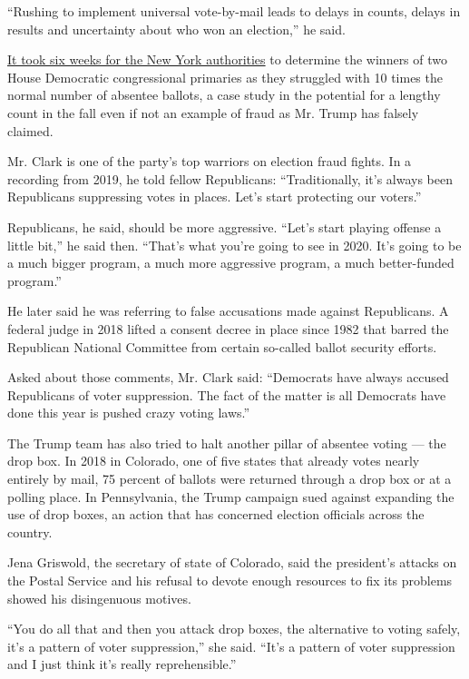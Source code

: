 ``Rushing to implement universal vote-by-mail leads to delays in counts,
delays in results and uncertainty about who won an election,'' he said.

\href{https://www.nytimes.com/2020/08/04/nyregion/maloney-torres-ny-congressional-races.html}{It
took six weeks for the New York authorities} to determine the winners of
two House Democratic congressional primaries as they struggled with 10
times the normal number of absentee ballots, a case study in the
potential for a lengthy count in the fall even if not an example of
fraud as Mr. Trump has falsely claimed.

Mr. Clark is one of the party's top warriors on election fraud fights.
In a recording from 2019, he told fellow Republicans: ``Traditionally,
it's always been Republicans suppressing votes in places. Let's start
protecting our voters.''

Republicans, he said, should be more aggressive. ``Let's start playing
offense a little bit,'' he said then. ``That's what you're going to see
in 2020. It's going to be a much bigger program, a much more aggressive
program, a much better-funded program.''

He later said he was referring to false accusations made against
Republicans. A federal judge in 2018 lifted a consent decree in place
since 1982 that barred the Republican National Committee from certain
so-called ballot security efforts.

Asked about those comments, Mr. Clark said: ``Democrats have always
accused Republicans of voter suppression. The fact of the matter is all
Democrats have done this year is pushed crazy voting laws.''

The Trump team has also tried to halt another pillar of absentee voting
--- the drop box. In 2018 in Colorado, one of five states that already
votes nearly entirely by mail, 75 percent of ballots were returned
through a drop box or at a polling place. In Pennsylvania, the Trump
campaign sued against expanding the use of drop boxes, an action that
has concerned election officials across the country.

Jena Griswold, the secretary of state of Colorado, said the president's
attacks on the Postal Service and his refusal to devote enough resources
to fix its problems showed his disingenuous motives.

``You do all that and then you attack drop boxes, the alternative to
voting safely, it's a pattern of voter suppression,'' she said. ``It's a
pattern of voter suppression and I just think it's really
reprehensible.''

